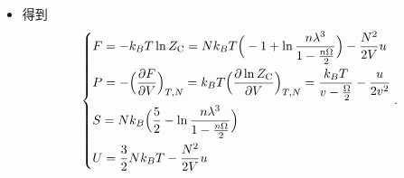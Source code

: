 \begin{itemize}
	\item 得到
	\begin{equation}
		\begin{dcases}
			F = - k_B T \ln Z_\text{C} = N k_B T \Big( - 1 + \ln \frac{n \lambda^3}{1 - \frac{n \Omega}{2}} \Big) - \frac{N^2}{2 V} u \\
			P = - \Big( \frac{\partial F}{\partial V} \Big)_{T, N} = k_B T \Big( \frac{\partial \ln Z_\text{C}}{\partial V} \Big)_{T, N} = \frac{k_B T}{v - \frac{\Omega}{2}} - \frac{u}{2 v^2} \\
			S = N k_B \Big( \frac{5}{2} - \ln \frac{n \lambda^3}{1 - \frac{n \Omega}{2}} \Big) \\
			U = \frac{3}{2} N k_B T - \frac{N^2}{2 V} u
		\end{dcases}.
	\end{equation}
\end{itemize}

